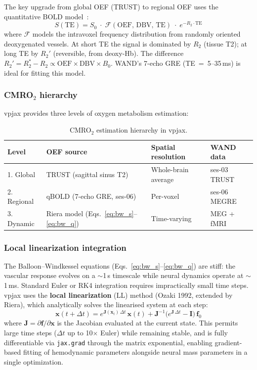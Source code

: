 \documentclass[11pt,a4paper]{article}\usepackage[]{graphicx}\usepackage[]{xcolor}
\begin{document}
The key upgrade from global OEF (TRUST) to regional OEF uses the
quantitative BOLD model~\citep{He2007qbold}:
%
\begin{equation}
  S(\text{TE}) = S_0 \;\cdot\; \mathcal{F}(\text{OEF},\,\text{DBV},\,\text{TE})
    \;\cdot\; e^{-R_2 \cdot \text{TE}}
  \label{eq:qbold}
\end{equation}
%
where $\mathcal{F}$ models the intravoxel frequency distribution from
randomly oriented deoxygenated vessels. At short TE the signal is
dominated by $R_2$ (tissue T2); at long TE by $R_2'$ (reversible,
from deoxy-Hb). The difference $R_2' = R_2^* - R_2 \propto
\text{OEF} \times \text{DBV} \times B_0$. WAND's 7-echo GRE
(TE~=~5--35\,ms) is ideal for fitting this model.

\subsubsection{CMRO$_2$ hierarchy}

vpjax provides three levels of oxygen metabolism estimation:
%
\begin{table}[htbp]
\centering
\caption{CMRO$_2$ estimation hierarchy in vpjax.}
\label{tab:cmro2}
\begin{tabular}{llll}
\toprule
Level & OEF source & Spatial resolution & WAND data \\
\midrule
1. Global  & TRUST (sagittal sinus T2)   & Whole-brain average & ses-03 TRUST \\
2. Regional & qBOLD (7-echo GRE, ses-06) & Per-voxel           & ses-06 MEGRE \\
3. Dynamic  & Riera model (Eqs.~\ref{eq:bw_s}--\ref{eq:bw_q}) & Time-varying & MEG + fMRI \\
\bottomrule
\end{tabular}
\end{table}

\subsubsection{Local linearization integration}

The Balloon--Windkessel equations (Eqs.~\ref{eq:bw_s}--\ref{eq:bw_q})
are stiff: the vascular response evolves on a $\sim$1\,s timescale while
neural dynamics operate at $\sim$1\,ms. Standard Euler or RK4 integration
requires impractically small time steps. vpjax uses the
\textbf{local linearization} (LL) method (Ozaki 1992, extended by Riera),
which analytically solves the linearised system at each step:
%
\begin{equation}
  \mathbf{x}(t+\Delta t) = e^{\mathbf{J}(\mathbf{x}_t)\,\Delta t}\,\mathbf{x}(t)
    + \mathbf{J}^{-1}\!\bigl(e^{\mathbf{J}\,\Delta t} - \mathbf{I}\bigr)\,\mathbf{f}_0
\end{equation}
%
where $\mathbf{J} = \partial\mathbf{f}/\partial\mathbf{x}$ is the Jacobian
evaluated at the current state. This permits large time steps ($\Delta t$
up to 10$\times$ Euler) while remaining stable, and is fully differentiable
via \texttt{jax.grad} through the matrix exponential, enabling gradient-based
fitting of hemodynamic parameters alongside neural mass parameters in a
single optimization.
\end{document}
